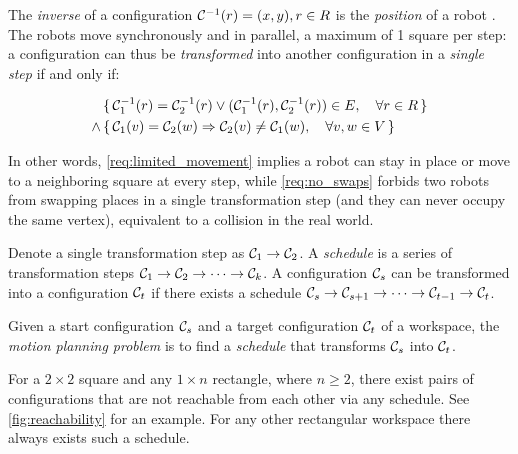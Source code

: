 The \emph{inverse} of a configuration $\mathcal{C}_{}^{-1}(r) = (x, y), r \in R$ is the \emph{position} of a robot . 
The robots move synchronously and in parallel, a maximum of 1 square  per step:
a configuration can thus be \emph{transformed} into another configuration in a \emph{single step} if and only if:

\begin{align}
	& \set{\mathcal{C}_{1}^{-1}(r) = \mathcal{C}_{2}^{-1}(r) \lor (\mathcal{C}_{1}^{-1}(r), \mathcal{C}_{2}^{-1}(r)) \in E, \quad \forall r \in R}\label{req:limited_movement}\\
	\land & \set{\mathcal{C}_{1}(v) = \mathcal{C}_{2}(w) \Rightarrow \mathcal{C}_{2}(v) \neq \mathcal{C}_{1}(w), \quad \forall v, w \in V}\label{req:no_swaps}
\end{align}


In other words, \cref{req:limited_movement} implies a robot can stay in place or move to a neighboring square at every step, while \cref{req:no_swaps} forbids two robots from swapping places in a single transformation step (and they can never occupy the same vertex), equivalent to a collision in the real world.

Denote a single transformation step as $\mathcal{C}_{1} \rightarrow \mathcal{C}_{2}$.
A \emph{schedule} is a series  of transformation steps $\mathcal{C}_{1} \rightarrow \mathcal{C}_{2} \rightarrow \cdots \rightarrow \mathcal{C}_{k}$. 
A configuration $\mathcal{C}_{s}$ can be transformed into a configuration $\mathcal{C}_{t}$ if there exists a schedule $\mathcal{C}_{s} \rightarrow \mathcal{C}_{s + 1} \rightarrow \cdots \rightarrow \mathcal{C}_{t - 1} \rightarrow \mathcal{C}_{t}$.


\begin{definition}\label{def:motion_planning_problem}
	Given a start configuration $\mathcal{C}_{s}$ and a target configuration $\mathcal{C}_{t}$ of a workspace, 
	the \emph{motion planning problem} is  to find a \emph{schedule} that transforms $\mathcal{C}_{s}$ into $\mathcal{C}_{t}$.
\end{definition}

\begin{remark}\label{remark:reachability}
	For a $2 \times 2$ square and any $1 \times n$ rectangle, where $n \geq 2$, there exist pairs of configurations that are not reachable from each other via any schedule. See \cref{fig:reachability} for an example.
	For any other rectangular workspace there always exists such a schedule. 
\end{remark}

